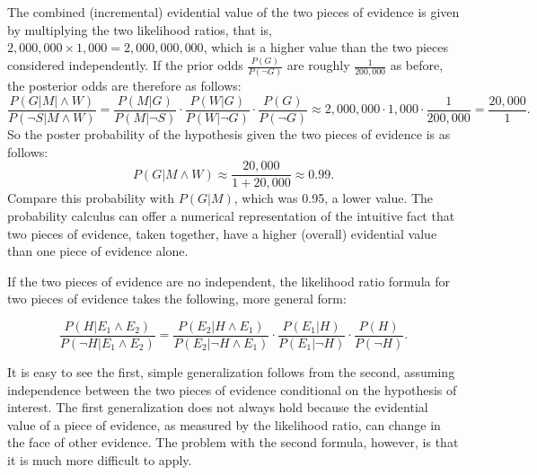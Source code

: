 \documentclass[10pt]{article}
\begin{document}
The combined (incremental) evidential value of the two pieces of evidence is given by multiplying the two likelihood 
ratios, that is, $2,000,000\times 1,000=2,000,000,000$, which is a higher value 
than the two pieces considered independently. 
If the prior odds $\frac{P(G)}{P(\neg G)}$ are roughly $\frac{1}{200,000}$
as before, the posterior odds are therefore as follows:
%
\[\frac{P(G|M|\wedge W)}{P(\neg S|M\wedge W)}= \frac{P(M |G)}{P( M | \neg S)}\cdot  \frac{P(W |G)}{P( W | \neg G)}\cdot \frac{P(G)}{P(\neg G)} \approx 2,000,000 \cdot  1,000 \cdot \frac{1}{200,000}= \frac{20,000}{1}.\]
% 
So the poster probability of the hypothesis given the two pieces of evidence is as follows:
%
\[P(G|M\wedge W) \approx \frac{20,000}{1+20,000}\approx 0.99.\]
%
Compare this probability with $P(G|M)$, which 
was 0.95, a lower value. The probability calculus can offer a numerical 
representation of the intuitive fact that two pieces of evidence, taken together, 
have a higher (overall) evidential value than one piece of evidence alone. 

 If the two pieces of evidence are no independent, 
the likelihood ratio formula for two pieces of evidence 
takes the following, more general 
form:

	\[ \frac{P(H|E_1 \land E_2)}{P(\neg H | E_1 \land E_2)} = 
	\frac{P(E_2 | H \land E_1)}{P(E_2| \neg H \land E_1)}
	\cdot 
	\frac{P(E_1 | H)}{P(E_1| \neg H)}
	\cdot 
	\frac{P(H)}{P(\neg H)}.\]

\noindent It is easy to see the first, simple generalization follows from the second, assuming 
independence between the two pieces of evidence conditional on the hypothesis of interest. 
The first generalization does not always hold because 
the evidential value of a piece of evidence, as measured by the likelihood ratio, 
can change in the face of other evidence. The problem with the second formula, however, is that it 
is much more difficult to apply.







\end{document}
